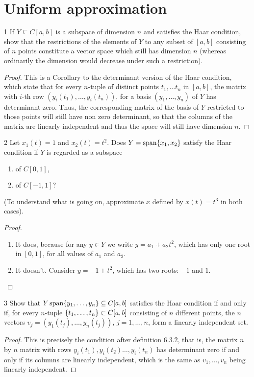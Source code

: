 \section{Uniform approximation}


\begin{exercise}{1}
If $Y \subseteq C[a,b]$ is a subspace of dimension $n$ and satisfies the Haar condition, show that the restrictions of the elements of $Y$ to any subset of $[a,b]$ consisting of $n$ points constitute a vector space which still has dimension $n$ (whereas ordinarily the dimension would decrease under such a restriction).
\end{exercise}
\begin{proof}
This is a Corollary to the determinant version of the Haar condition, which state that for every $n$-tuple of distinct points $t_1, \dots t_n$ in $[a,b]$, the matrix with $i$-th row $(y_i(t_1), \dots, y_i(t_n))$, for a basis $(y_1, \dots, y_n)$ of $Y$ has determinant zero.
Thus, the corresponding matrix of the basis of $Y$ restricted to those points will still have non zero determinant, so that the columns of the matrix are linearly independent and thus the space will still have dimension $n$.
\end{proof} 

\begin{exercise}{2}
Let $x_1(t) = 1$ and $x_2(t) = t^2$.
Does $Y = \operatorname*{span} \{x_1, x_2\}$ satisfy the Haar condition if $Y$ is regarded as a subspace 
\begin{enumerate}
    \item of $C[0,1]$,
    \item of $C[-1, 1]$?
\end{enumerate}
(To understand what is going on, approximate $x$ defined by $x(t) = t^3$ in both cases).
\end{exercise}
\begin{proof}
\begin{enumerate}
    \item It does, because for any $y \in Y$ we write $y = a_1 + a_2 t^2$, which has only one root in $[0,1]$, for all values of $a_1$ and $a_2$.
    \item It doesn't.
    Consider $y = -1 + t^2$, which has two roots:
    $-1$ and $1$.
\end{enumerate}
\end{proof} 

\begin{exercise}{3}
Show that $Y \operatorname*{span} \{y_1, \dots, y_n\} \subseteq C[a,b]$ satisfies the Haar condition if and only if, for every $n$-tuple $\{t_1, \dots, t_n\} \subset C[a,b]$ consisting of $n$ different points, the $n$ vectors $v_j = (y_1(t_j), \dots, y_n(t_j))$, $j = 1, \dots, n$, form a linearly independent set.
\end{exercise}
\begin{proof}
This is precisely the condition after definition 6.3.2, that is, the matrix $n$ by $n$ matrix with rows $y_i(t_1), y_i(t_2) \dots, y_i(t_n)$ has determinant zero if and only if its columns are linearly independent, which is the same as $v_1, \dots, v_n$ being linearly independent.
\end{proof} 

